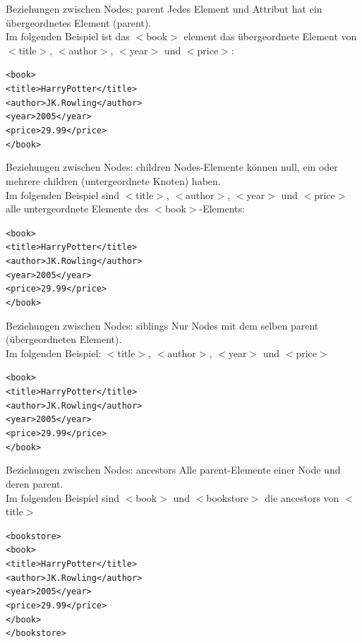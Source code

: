 \documentclass[xcolor=dvipsnames]{beamer}\usepackage[]{graphicx}\usepackage[]{color}
\makeatletter
\newenvironment{kframe}{%
 \def\at@end@of@kframe{}%
 \ifinner\ifhmode%
  \def\at@end@of@kframe{\end{minipage}}%
  \begin{minipage}{\columnwidth}%
 \fi\fi%
 \def\FrameCommand##1{\hskip\@totalleftmargin \hskip-\fboxsep
 \colorbox{shadecolor}{##1}\hskip-\fboxsep
     \hskip-\linewidth \hskip-\@totalleftmargin \hskip\columnwidth}%
 \MakeFramed {\advance\hsize-\width
   \@totalleftmargin\z@ \linewidth\hsize
   \@setminipage}}%
 {\par\unskip\endMakeFramed%
 \at@end@of@kframe}
\makeatother
\begin{document}
\begin{frame}[fragile]{Beziehungen zwischen Nodes: parent}
Jedes Element und Attribut hat ein übergeordnetes Element (parent).\\
Im folgenden Beispiel ist das $<$book$>$ element das übergeordnete Element von $<$title$>$, $<$author$>$, $<$year$>$ und $<$price$>$:
\begin{kframe}
\begin{alltt}
<book>
  <title>Harry Potter</title>
  <author>J K. Rowling</author>
  <year>2005</year>
  <price>29.99</price>
</book>
\end{alltt}
\end{kframe}
\end{frame}


\begin{frame}[fragile]{Beziehungen zwischen Nodes: children}
Nodes-Elemente können null, ein oder mehrere children (untergeordnete Knoten) haben. \\
Im folgenden Beispiel sind $<$title$>$, $<$author$>$, $<$year$>$ und $<$price$>$ alle untergeordnete Elemente des $<$book$>$-Elements:
\begin{kframe}
\begin{alltt}
<book>
  <title>Harry Potter</title>
  <author>J K. Rowling</author>
  <year>2005</year>
  <price>29.99</price>
</book>
\end{alltt}
\end{kframe}
\end{frame}


\begin{frame}[fragile]{Beziehungen zwischen Nodes: siblings}
Nur Nodes mit dem selben parent (übergeordneten Element). \\
Im folgenden Beispiel: $<$title$>$, $<$author$>$, $<$year$>$ und $<$price$>$
\begin{kframe}
\begin{alltt}
<book>
  <title>Harry Potter</title>
  <author>J K. Rowling</author>
  <year>2005</year>
  <price>29.99</price>
</book>
\end{alltt}
\end{kframe}
\end{frame}


\begin{frame}[fragile]{Beziehungen zwischen Nodes: ancestors}
Alle parent-Elemente einer Node und deren parent. \\
Im folgenden Beispiel sind $<$book$>$ und $<$bookstore$>$ die ancestors von $<$title$>$
\begin{kframe}
\begin{alltt}
<bookstore>
  <book>
    <title>Harry Potter</title>
    <author>J K. Rowling</author>
    <year>2005</year>
    <price>29.99</price>
  </book>
</bookstore>
\end{alltt}
\end{kframe}
\end{frame}
\end{document}
